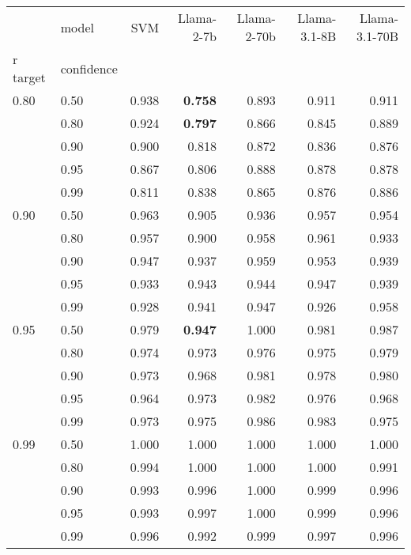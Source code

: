\begin{tabular}{llrrrrr}
\toprule
 & model & SVM & Llama-2-7b & Llama-2-70b & Llama-3.1-8B & Llama-3.1-70B \\
r target & confidence &  &  &  &  &  \\
\midrule
0.80 & 0.50 & 0.938 & \textbf{0.758} & 0.893 & 0.911 & 0.911 \\
 & 0.80 & 0.924 & \textbf{0.797} & 0.866 & 0.845 & 0.889 \\
 & 0.90 & 0.900 & 0.818 & 0.872 & 0.836 & 0.876 \\
 & 0.95 & 0.867 & 0.806 & 0.888 & 0.878 & 0.878 \\
 & 0.99 & 0.811 & 0.838 & 0.865 & 0.876 & 0.886 \\
\cline{1-7}
0.90 & 0.50 & 0.963 & 0.905 & 0.936 & 0.957 & 0.954 \\
 & 0.80 & 0.957 & 0.900 & 0.958 & 0.961 & 0.933 \\
 & 0.90 & 0.947 & 0.937 & 0.959 & 0.953 & 0.939 \\
 & 0.95 & 0.933 & 0.943 & 0.944 & 0.947 & 0.939 \\
 & 0.99 & 0.928 & 0.941 & 0.947 & 0.926 & 0.958 \\
\cline{1-7}
0.95 & 0.50 & 0.979 & \textbf{0.947} & 1.000 & 0.981 & 0.987 \\
 & 0.80 & 0.974 & 0.973 & 0.976 & 0.975 & 0.979 \\
 & 0.90 & 0.973 & 0.968 & 0.981 & 0.978 & 0.980 \\
 & 0.95 & 0.964 & 0.973 & 0.982 & 0.976 & 0.968 \\
 & 0.99 & 0.973 & 0.975 & 0.986 & 0.983 & 0.975 \\
\cline{1-7}
0.99 & 0.50 & 1.000 & 1.000 & 1.000 & 1.000 & 1.000 \\
 & 0.80 & 0.994 & 1.000 & 1.000 & 1.000 & 0.991 \\
 & 0.90 & 0.993 & 0.996 & 1.000 & 0.999 & 0.996 \\
 & 0.95 & 0.993 & 0.997 & 1.000 & 0.999 & 0.996 \\
 & 0.99 & 0.996 & 0.992 & 0.999 & 0.997 & 0.996 \\
\cline{1-7}
\bottomrule
\end{tabular}

